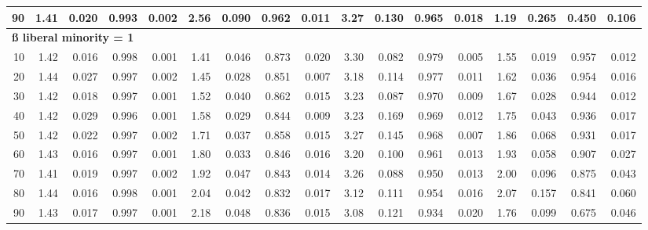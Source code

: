 \documentclass[
]{article}
\begin{document}
\begin{table}[H]
{\begin{tabular}{r|r|r|r|r|r|r|r|r|r|r|r|r|r|r|r|r}
\hline
\hspace{1em}90 & 1.41 & 0.020 & 0.993 & 0.002 & 2.56 & 0.090 & 0.962 & 0.011 & 3.27 & 0.130 & 0.965 & 0.018 & 1.19 & 0.265 & 0.450 & 0.106\\
\hline
\multicolumn{17}{l}{\textbf{ß liberal minority = 1}}\\
\hline
\hspace{1em}10 & 1.42 & 0.016 & 0.998 & 0.001 & 1.41 & 0.046 & 0.873 & 0.020 & 3.30 & 0.082 & 0.979 & 0.005 & 1.55 & 0.019 & 0.957 & 0.012\\
\hline
\hspace{1em}20 & 1.44 & 0.027 & 0.997 & 0.002 & 1.45 & 0.028 & 0.851 & 0.007 & 3.18 & 0.114 & 0.977 & 0.011 & 1.62 & 0.036 & 0.954 & 0.016\\
\hline
\hspace{1em}30 & 1.42 & 0.018 & 0.997 & 0.001 & 1.52 & 0.040 & 0.862 & 0.015 & 3.23 & 0.087 & 0.970 & 0.009 & 1.67 & 0.028 & 0.944 & 0.012\\
\hline
\hspace{1em}40 & 1.42 & 0.029 & 0.996 & 0.001 & 1.58 & 0.029 & 0.844 & 0.009 & 3.23 & 0.169 & 0.969 & 0.012 & 1.75 & 0.043 & 0.936 & 0.017\\
\hline
\hspace{1em}50 & 1.42 & 0.022 & 0.997 & 0.002 & 1.71 & 0.037 & 0.858 & 0.015 & 3.27 & 0.145 & 0.968 & 0.007 & 1.86 & 0.068 & 0.931 & 0.017\\
\hline
\hspace{1em}60 & 1.43 & 0.016 & 0.997 & 0.001 & 1.80 & 0.033 & 0.846 & 0.016 & 3.20 & 0.100 & 0.961 & 0.013 & 1.93 & 0.058 & 0.907 & 0.027\\
\hline
\hspace{1em}70 & 1.41 & 0.019 & 0.997 & 0.002 & 1.92 & 0.047 & 0.843 & 0.014 & 3.26 & 0.088 & 0.950 & 0.013 & 2.00 & 0.096 & 0.875 & 0.043\\
\hline
\hspace{1em}80 & 1.44 & 0.016 & 0.998 & 0.001 & 2.04 & 0.042 & 0.832 & 0.017 & 3.12 & 0.111 & 0.954 & 0.016 & 2.07 & 0.157 & 0.841 & 0.060\\
\hline
\hspace{1em}90 & 1.43 & 0.017 & 0.997 & 0.001 & 2.18 & 0.048 & 0.836 & 0.015 & 3.08 & 0.121 & 0.934 & 0.020 & 1.76 & 0.099 & 0.675 & 0.046\\
\hline
\end{tabular}}\begin{table}
\centering
{}
\end{table}
\end{table}
\end{document}
